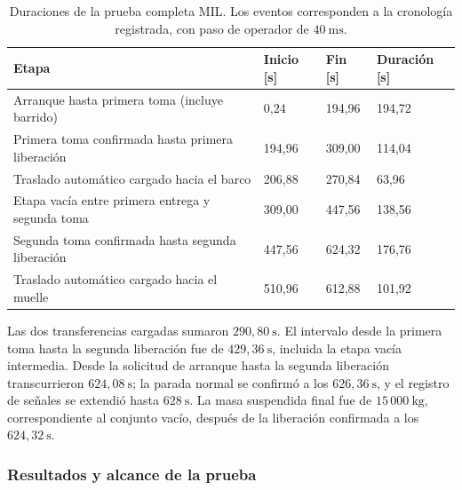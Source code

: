 \documentclass[a4paper,10pt,onecolumn,journal]{ieeeconf}
\numberwithin{equation}{section}
\begin{document}
\begin{table}[!htb]
\centering\small
\caption{Duraciones de la prueba completa MIL. Los eventos corresponden a la cronología registrada, con paso de operador de $40~\mathrm{ms}$.}
\label{tab:duraciones_completa_MIL}
\begin{tabular}{L{.44\textwidth}C{.15\textwidth}C{.15\textwidth}C{.11\textwidth}}\toprule
Etapa & Inicio [s] & Fin [s] & Duración [s]\\\midrule
Arranque hasta primera toma (incluye barrido) & 0,24 & 194,96 & 194,72\\
Primera toma confirmada hasta primera liberación & 194,96 & 309,00 & 114,04\\
Traslado automático cargado hacia el barco & 206,88 & 270,84 & 63,96\\
Etapa vacía entre primera entrega y segunda toma & 309,00 & 447,56 & 138,56\\
Segunda toma confirmada hasta segunda liberación & 447,56 & 624,32 & 176,76\\
Traslado automático cargado hacia el muelle & 510,96 & 612,88 & 101,92\\\bottomrule
\end{tabular}
\end{table}

Las dos transferencias cargadas sumaron $290{,}80~\mathrm{s}$. El intervalo desde la primera toma hasta la segunda liberación fue de $429{,}36~\mathrm{s}$, incluida la etapa vacía intermedia. Desde la solicitud de arranque hasta la segunda liberación transcurrieron $624{,}08~\mathrm{s}$; la parada normal se confirmó a los $626{,}36~\mathrm{s}$, y el registro de señales se extendió hasta $628~\mathrm{s}$. La masa suspendida final fue de $15\,000~\mathrm{kg}$, correspondiente al conjunto vacío, después de la liberación confirmada a los $624{,}32~\mathrm{s}$.


\subsubsection{Resultados y alcance de la prueba}
\end{document}
